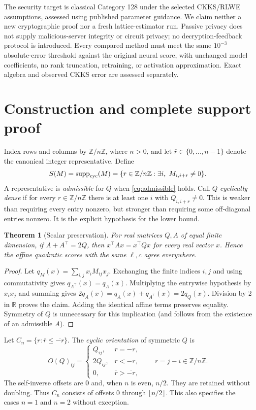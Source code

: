 \documentclass[10pt]{article}
\newtheorem{theorem}{Theorem}
\newcommand{\R}{\mathbb R}
\newcommand{\Zn}{\mathbb Z/n\mathbb Z}
\newcommand{\supp}{\operatorname{supp}_{\rm cyc}}
\begin{document}
The security target is classical Category 128 under the selected CKKS/RLWE assumptions, assessed using published parameter guidance. We claim neither a new cryptographic proof nor a fresh lattice-estimator run. Passive privacy does not supply malicious-server integrity or circuit privacy; no decryption-feedback protocol is introduced. Every compared method must meet the same $10^{-3}$ absolute-error threshold against the original neural score, with unchanged model coefficients, no rank truncation, retraining, or activation approximation. Exact algebra and observed CKKS error are assessed separately.

\section{Construction and complete support proof}\label{sec:math}
Index rows and columns by $\Zn$, where $n>0$, and let $\bar r\in\{0,\ldots,n-1\}$ denote the canonical integer representative. Define
\[
S(M)=\supp(M)=\{r\in\Zn:\exists i,\ M_{i,i+r}\ne0\}.
\]
A representative is \emph{admissible} for $Q$ when \eqref{eq:admissible} holds. Call $Q$ \emph{cyclically dense} if for every $r\in\Zn$ there is at least one $i$ with $Q_{i,i+r}\ne0$. This is weaker than requiring every entry nonzero, but stronger than requiring some off-diagonal entries nonzero. It is the explicit hypothesis for the lower bound.

\begin{theorem}[Scalar preservation]\label{thm:preserve}
For real matrices $Q,A$ of equal finite dimension, if $A+A^\top=2Q$, then $x^\top Ax=x^\top Qx$ for every real vector $x$. Hence the affine quadratic scores with the same $\ell,c$ agree everywhere.
\end{theorem}
\begin{proof}
Let $q_M(x)=\sum_{i,j}x_iM_{ij}x_j$. Exchanging the finite indices $i,j$ and using commutativity gives $q_{A^\top}(x)=q_A(x)$. Multiplying the entrywise hypothesis by $x_ix_j$ and summing gives
$2q_A(x)=q_A(x)+q_{A^\top}(x)=2q_Q(x)$. Division by $2$ in $\R$ proves the claim. Adding the identical affine terms preserves equality. Symmetry of $Q$ is unnecessary for this implication (and follows from the existence of an admissible $A$).
\end{proof}

Let $C_n=\{r:\bar r\le\overline{-r}\}$. The \emph{cyclic orientation} of symmetric $Q$ is
\begin{equation}\label{eq:orientation}
O(Q)_{ij}=\begin{cases}
Q_{ij},&r=-r,\\
2Q_{ij},&\bar r<\overline{-r},\\
0,&\bar r>\overline{-r},
\end{cases}\qquad r=j-i\in\Zn.
\end{equation}
The self-inverse offsets are $0$ and, when $n$ is even, $n/2$. They are retained without doubling. Thus $C_n$ consists of offsets $0$ through $\lfloor n/2\rfloor$. This also specifies the cases $n=1$ and $n=2$ without exception.
\end{document}
